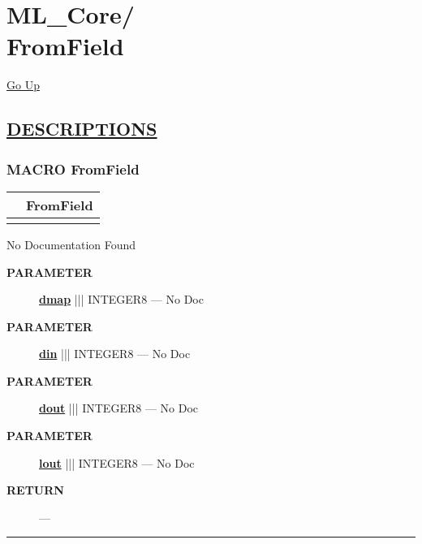 \chapter*{\color{headfile}
{\large ML\_Core\slash\hspace{0pt}}
 \\
FromField
}
\hypertarget{ecldoc:toc:ML_Core.FromField}{}
\hyperlink{ecldoc:toc:root/ML_Core}{Go Up}


\section*{\underline{\textsf{DESCRIPTIONS}}}
\subsection*{\textsf{\colorbox{headtoc}{\color{white} MACRO}
FromField}}

\hypertarget{ecldoc:ml_core.fromfield}{}

{\renewcommand{\arraystretch}{1.5}
\begin{tabularx}{\textwidth}{|>{\raggedright\arraybackslash}l|X|}
\hline
\hspace{0pt}\mytexttt{\color{red} } & \textbf{FromField} \\
\hline
\multicolumn{2}{|>{\raggedright\arraybackslash}X|}{\hspace{0pt}\mytexttt{\color{param} (dIn,lOut,dOut,dMap='')}} \\
\hline
\end{tabularx}
}

\par





No Documentation Found






\par
\begin{description}
\item [\colorbox{tagtype}{\color{white} \textbf{\textsf{PARAMETER}}}] \textbf{\underline{dmap}} ||| INTEGER8 --- No Doc
\item [\colorbox{tagtype}{\color{white} \textbf{\textsf{PARAMETER}}}] \textbf{\underline{din}} ||| INTEGER8 --- No Doc
\item [\colorbox{tagtype}{\color{white} \textbf{\textsf{PARAMETER}}}] \textbf{\underline{dout}} ||| INTEGER8 --- No Doc
\item [\colorbox{tagtype}{\color{white} \textbf{\textsf{PARAMETER}}}] \textbf{\underline{lout}} ||| INTEGER8 --- No Doc
\end{description}







\par
\begin{description}
\item [\colorbox{tagtype}{\color{white} \textbf{\textsf{RETURN}}}] \textbf{} --- 
\end{description}




\rule{\linewidth}{0.5pt}
